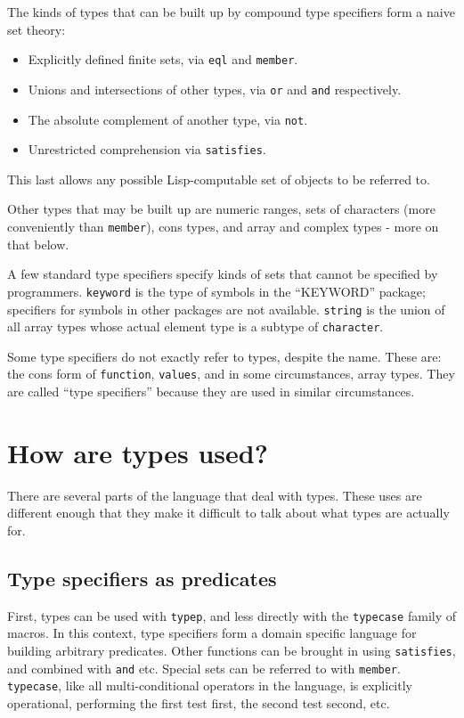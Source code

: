 \documentclass{article}
\begin{document}
The kinds of types that can be built up by compound type specifiers form a naive set theory:

\begin{itemize}
\item Explicitly defined finite sets, via \texttt{eql} and \texttt{member}.
\item Unions and intersections of other types, via \texttt{or} and \texttt{and} respectively.
\item The absolute complement of another type, via \texttt{not}.
\item Unrestricted comprehension via \texttt{satisfies}.
\end{itemize}

This last allows any possible Lisp-computable set of objects to be referred to.

Other types that may be built up are numeric ranges, sets of characters (more conveniently than \texttt{member}), cons types, and array and complex types - more on that below.

A few standard type specifiers specify kinds of sets that cannot be specified by programmers. \texttt{keyword} is the type of symbols in the ``KEYWORD'' package; specifiers for symbols in other packages are not available. \texttt{string} is the union of all array types whose actual element type is a subtype of \texttt{character}.

Some type specifiers do not exactly refer to types, despite the name. These are: the cons form of \texttt{function}, \texttt{values}, and in some circumstances, array types. They are called ``type specifiers'' because they are used in similar circumstances.



\section{How are types used?}

There are several parts of the language that deal with types. These uses are different enough that they make it difficult to talk about what types are actually for.


\subsection{Type specifiers as predicates}

First, types can be used with \texttt{typep}, and less directly with the \texttt{typecase} family of macros. In this context, type specifiers form a domain specific language for building arbitrary predicates. Other functions can be brought in using \texttt{satisfies}, and combined with \texttt{and} etc. Special sets can be referred to with \texttt{member}. \texttt{typecase}, like all multi-conditional operators in the language, is explicitly operational, performing the first test first, the second test second, etc.
\end{document}
